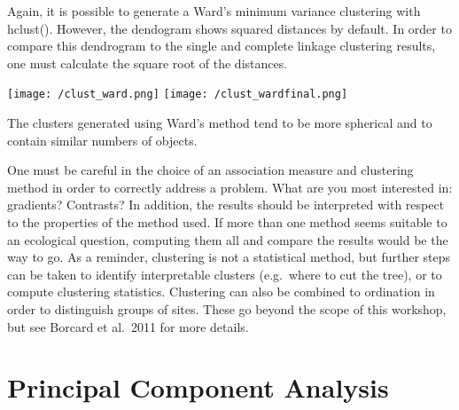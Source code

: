 \documentclass[
]{book}
\newenvironment{Shaded}{\begin{snugshade}}{\end{snugshade}}
\newcommand{\AttributeTok}[1]{\textcolor[rgb]{0.77,0.63,0.00}{#1}}
\newcommand{\CommentTok}[1]{\textcolor[rgb]{0.56,0.35,0.01}{\textit{#1}}}
\newcommand{\DecValTok}[1]{\textcolor[rgb]{0.00,0.00,0.81}{#1}}
\newcommand{\FunctionTok}[1]{\textcolor[rgb]{0.00,0.00,0.00}{#1}}
\newcommand{\NormalTok}[1]{#1}
\newcommand{\OtherTok}[1]{\textcolor[rgb]{0.56,0.35,0.01}{#1}}
\newcommand{\SpecialCharTok}[1]{\textcolor[rgb]{0.00,0.00,0.00}{#1}}
\newcommand{\StringTok}[1]{\textcolor[rgb]{0.31,0.60,0.02}{#1}}
\begin{document}
Again, it is possible to generate a Ward's minimum variance clustering
with hclust(). However, the dendogram shows squared distances by
default. In order to compare this dendrogram to the single and complete
linkage clustering results, one must calculate the square root of the
distances.

\begin{Shaded}
\end{Shaded}

\texttt{[image: /clust\_ward.png]}
\texttt{[image: /clust\_wardfinal.png]}

The clusters generated using Ward's method tend to be more spherical and
to contain similar numbers of objects.

One must be careful in the choice of an association measure and
clustering method in order to correctly address a problem. What are you
most interested in: gradients? Contrasts? In addition, the results
should be interpreted with respect to the properties of the method used.
If more than one method seems suitable to an ecological question,
computing them all and compare the results would be the way to go. As a
reminder, clustering is not a statistical method, but further steps can
be taken to identify interpretable clusters (e.g.~where to cut the
tree), or to compute clustering statistics. Clustering can also be
combined to ordination in order to distinguish groups of sites. These go
beyond the scope of this workshop, but see Borcard et al.~2011 for more
details.

\hypertarget{principal-component-analysis}{%
\chapter{Principal Component Analysis}\label{principal-component-analysis}}
\end{document}
